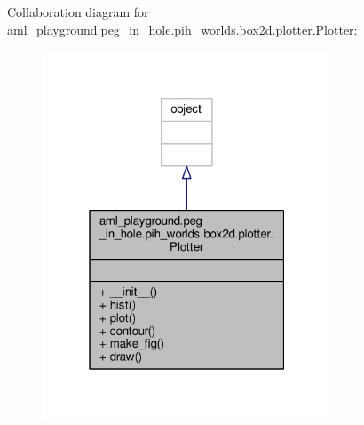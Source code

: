 Collaboration diagram for aml\-\_\-playground.\-peg\-\_\-in\-\_\-hole.\-pih\-\_\-worlds.\-box2d.\-plotter.\-Plotter\-:
\nopagebreak
\begin{figure}[H]
\begin{center}
\leavevmode
\includegraphics[width=244pt]{classaml__playground_1_1peg__in__hole_1_1pih__worlds_1_1box2d_1_1plotter_1_1_plotter__coll__graph}
\end{center}
\end{figure}
